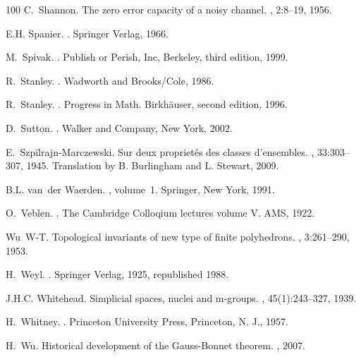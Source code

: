 \documentclass[12pt]{amsart}
\begin{document}
\begin{thebibliography}{100}
C.~Shannon.
\newblock The zero error capacity of a noisy channel.
, 2:8--19, 1956.

E.H. Spanier.
.
\newblock Springer Verlag, 1966.

M.~Spivak.
.
\newblock Publish or Perish, Inc, Berkeley, third edition, 1999.

R.~Stanley.
.
\newblock Wadworth and Brooks/Cole, 1986.

R.~Stanley.
.
\newblock Progress in Math. Birk{h\"a}user, second edition, 1996.

D.~Sutton.
.
\newblock Walker and Company, New York, 2002.

E.~Szpilrajn-Marczewski.
\newblock Sur deux propriet\'es des classes d'ensembles.
, 33:303--307, 1945.
\newblock Translation by B. Burlingham and L. Stewart, 2009.

B.L. van~der Waerden.
, volume~1.
\newblock Springer, New York, 1991.

O.~Veblen.
.
\newblock The Cambridge Colloqium lectures volume V. AMS, 1922.

Wu~W-T.
\newblock Topological invariants of new type of finite polyhedrons.
, 3:261--290, 1953.

H.~Weyl.
.
\newblock Springer Verlag, 1925, republished 1988.

J.H.C. Whitehead.
\newblock Simplicial spaces, nuclei and m-groups.
, 45(1):243--327, 1939.

H.~Whitney.
.
\newblock Princeton University Press, Princeton, N. J., 1957.

H.~Wu.
\newblock Historical development of the {Gauss-Bonnet} theorem.
, 2007.


\end{thebibliography}
\end{document}
